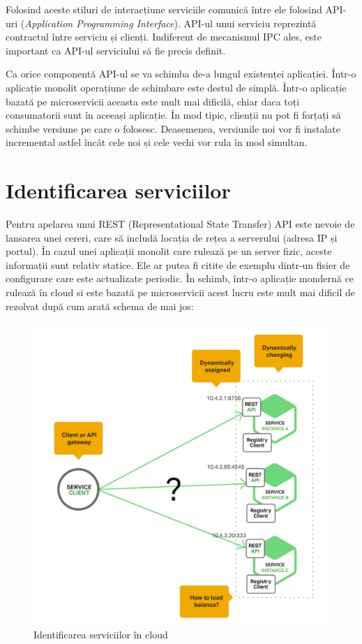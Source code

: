\documentclass[12pt, a4paper, oneside, romanian]{teza-upb}
\begin{document}
Folosind aceste stiluri de interacțiune serviciile comunică între ele folosind API-uri (\textit{Application Programming Interface}). API-ul unui serviciu reprezintă contractul între serviciu și clienți. Indiferent de mecanismul IPC ales, este important ca API-ul serviciului să fie precis definit.

Ca orice componentă API-ul se va schimba de-a lungul existenței aplicației. Într-o aplicație monolit operațiune de schimbare este destul de simplă. Într-o aplicație bazată pe microservicii aceasta este mult mai dificilă, chiar daca toți consumatorii sunt în aceeași aplicație. În mod tipic, clienții nu pot fi forțați să schimbe versiune pe care o folosesc. Deasemenea, versiunile noi vor fi instalate incremental astfel încât cele noi și cele vechi vor rula în mod simultan. 
\newpage
\section{Identificarea serviciilor}

Pentru apelarea unui REST (Representational State Transfer) API este nevoie de lansarea unei cereri, care să includă locația de rețea a serverului (adresa IP și portul). În cazul unei aplicații monolit care rulează pe un server fizic, aceste informații sunt relativ statice. Ele ar putea fi citite de exemplu dintr-un fisier de configurare care este actualizate periodic. În schimb, într-o aplicație mondernă ce rulează în cloud si este bazată pe microservicii acest lucru este mult mai dificil de rezolvat după cum arată schema de mai jos:

\begin{figure}[ht]
\centering
\includegraphics[scale=0.2]{img/Richardson-microservices-part4-1_difficult-service-discovery.png}
\caption{Identificarea serviciilor în cloud}
\label{fig:arhi_componente}
\end{figure}
\end{document}

